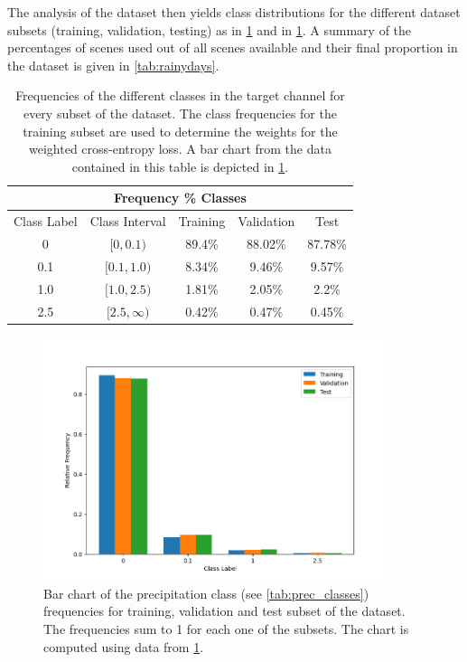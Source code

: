 The analysis of the dataset then yields class distributions for the different dataset subsets (training, validation, testing) as in \cref{tab:classdistributions} and in \cref{fig:classdistributions}. A summary of the percentages of scenes used out of all scenes available and their final proportion in the dataset is given in \cref{tab:rainydays}.
\begin{table}[h]
    \centering
    \begin{tabular}{ccccc}
    \hline
         \multicolumn{5}{c}{Frequency \% Classes}  \\
         \hline
         \hline
         Class Label & Class Interval & Training & Validation & Test \\
         \hline
         0 & $[0, 0.1)$ & 89.4\% & 88.02\% & 87.78\% \\
         0.1 & $[0.1, 1.0)$ & 8.34\% & 9.46\% & 9.57\% \\
         1.0 & $[1.0, 2.5)$ & 1.81\% & 2.05\% & 2.2\%  \\
         2.5 & $[2.5, \infty)$ & 0.42\% & 0.47\% & 0.45\% \\
         \hline
    \end{tabular}
    \caption{Frequencies of the different classes in the target channel for every subset of the dataset. The class frequencies for the training subset are used to determine the weights for the weighted cross-entropy loss. A bar chart from the data contained in this table is depicted in \cref{fig:classdistributions}.}
    \label{tab:classdistributions}
\end{table}
\begin{figure}[h]
    \centering
    \includegraphics[width=0.9\textwidth]{Class Frequencies Bar.png}
    \caption{Bar chart of the precipitation class (see \cref{tab:prec_classes}) frequencies for training, validation and test subset of the dataset. The frequencies sum to 1 for each one of the subsets. The chart is computed using data from \cref{tab:classdistributions}.}
    \label{fig:classdistributions}
\end{figure}
